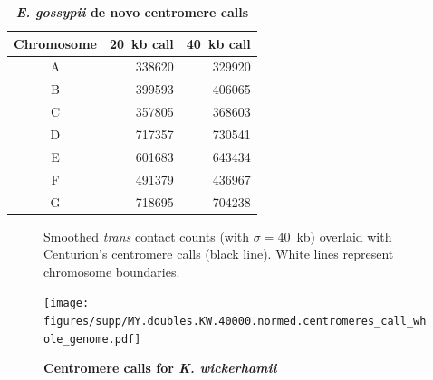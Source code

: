 \begin{table}[ht!]
\caption{\textbf{\textit{E. gossypii} de novo centromere calls}}
\begin{center}
\begin{tabular}{c | r r}
\textbf{Chromosome} & \textbf{20~kb call} & \textbf{40~kb call} \\
\hline
A & \num[group-separator={\,}]{338620} & \num[group-separator={\,}]{329920} \\
B & \num[group-separator={\,}]{399593} & \num[group-separator={\,}]{406065} \\
C & \num[group-separator={\,}]{357805} & \num[group-separator={\,}]{368603} \\
D & \num[group-separator={\,}]{717357} & \num[group-separator={\,}]{730541} \\
E & \num[group-separator={\,}]{601683} & \num[group-separator={\,}]{643434} \\
F & \num[group-separator={\,}]{491379} & \num[group-separator={\,}]{436967} \\
G & \num[group-separator={\,}]{718695} & \num[group-separator={\,}]{704238} \\
\end{tabular}
\end{center}
\end{table}

\clearpage


\begin{figure}[ht!]
\caption{\textbf{Centromere calls for \textit{K. wickerhamii}}}{
Smoothed \textit{trans} contact counts (with $\sigma=40$~kb) overlaid with
Centurion's centromere calls (black line). White lines represent chromosome
boundaries.
}
\begin{center}
\texttt{[image: figures/supp/MY.doubles.KW.40000.normed.centromeres\_call\_whole\_genome.pdf]}
\end{center}
\label{suppfig:KW_calls}
\end{figure}


